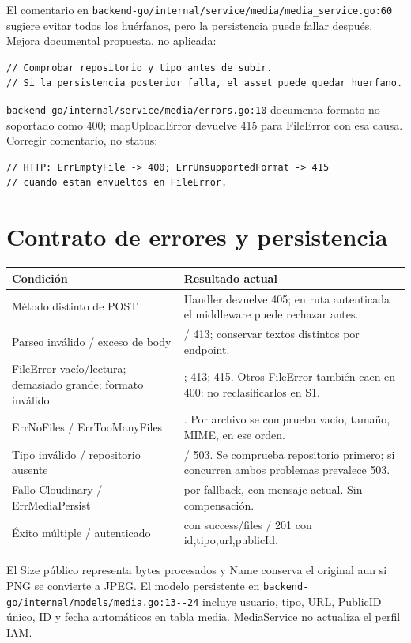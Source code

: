 \documentclass[11pt,a4paper]{article}
\begin{document}
El comentario en \nolinkurl{backend-go/internal/service/media/media_service.go:60} sugiere evitar todos los huérfanos, pero la persistencia puede fallar después. Mejora documental propuesta, no aplicada:
\begin{lstlisting}
// Comprobar repositorio y tipo antes de subir.
// Si la persistencia posterior falla, el asset puede quedar huerfano.
\end{lstlisting}
\nolinkurl{backend-go/internal/service/media/errors.go:10} documenta formato no soportado como 400; mapUploadError devuelve 415 para FileError con esa causa. Corregir comentario, no status:
\begin{lstlisting}
// HTTP: ErrEmptyFile -> 400; ErrUnsupportedFormat -> 415
// cuando estan envueltos en FileError.
\end{lstlisting}

\section{Contrato de errores y persistencia}
\begin{longtable}{>{\raggedright\arraybackslash}p{}>{\raggedright\arraybackslash}p{}}
\toprule
Condición & Resultado actual\\ \midrule
Método distinto de POST & Handler devuelve 405; en ruta autenticada el middleware puede rechazar antes.\\
Parseo inválido / exceso de body & 400 / 413; conservar textos distintos por endpoint.\\
FileError vacío/lectura; demasiado grande; formato inválido & 400; 413; 415. Otros FileError también caen en 400: no reclasificarlos en S1.\\
ErrNoFiles / ErrTooManyFiles & 400. Por archivo se comprueba vacío, tamaño, MIME, en ese orden.\\
Tipo inválido / repositorio ausente & 400 / 503. Se comprueba repositorio primero; si concurren ambos problemas prevalece 503.\\
Fallo Cloudinary / ErrMediaPersist & 500 por fallback, con mensaje actual. Sin compensación.\\
Éxito múltiple / autenticado & 200 con success/files / 201 con id,tipo,url,publicId.\\
\bottomrule
\end{longtable}
El Size público representa bytes procesados y Name conserva el original aun si PNG se convierte a JPEG. El modelo persistente en \nolinkurl{backend-go/internal/models/media.go:13--24} incluye usuario, tipo, URL, PublicID único, ID y fecha automáticos en tabla media. MediaService no actualiza el perfil IAM.
\end{document}
